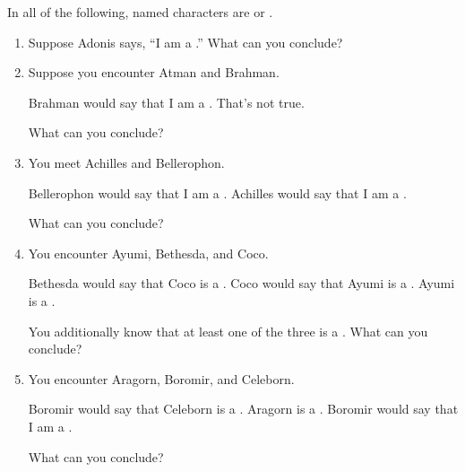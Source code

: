 \probsec{~\ref{sec:knights-knaves}}

  In all of the following, named characters are \knights or \knaves.

\begin{enumerate}
    \item Suppose Adonis says, ``I am a \knight.'' What can you conclude?

    \item Suppose you encounter Atman and Brahman.
  \begin{dialogue}
     Brahman would say that I am a \knight.
     That's not true.
  \end{dialogue}
  What can you conclude?

    \item You meet Achilles and Bellerophon.
  \begin{dialogue}
     Bellerophon would say that I am a \knave.
     Achilles would say that I am a \knight.
  \end{dialogue}
  What can you conclude?

    \item You encounter Ayumi, Bethesda, and Coco.
  \begin{dialogue}
     Bethesda would say that Coco is a \knave.
     Coco would say that Ayumi is a \knave.
     Ayumi is a \knight.
  \end{dialogue} 
  You additionally know that at least one of the three is a \knight. What can you conclude?

  \item You encounter Aragorn, Boromir, and Celeborn.
  \begin{dialogue}
     Boromir would say that Celeborn is a \knave.
     Aragorn is a \knave.
     Boromir would say that I am a \knave.
  \end{dialogue}
  What can you conclude?
\end{enumerate}

